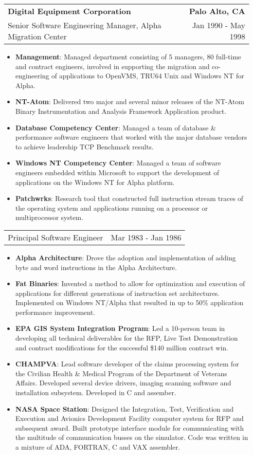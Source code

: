 \documentclass[letterpaper,11pt]{article}
\makeatletter
\newcommand{\resumeCompanyHeading}[4]{
  \vspace{-1pt}
    \item
    \begin{tabular*}{1.0\textwidth}[t]{l@{\extracolsep{\fill}}r}
      \textbf{#1} & \textbf{#2} \\
      {#3} & {#4}
    \end{tabular*}\vspace{-10pt}
  }
\newcommand{\resumeCompanyPositionHeading}[2]{
      \item
      \begin{tabular*}{1.0\textwidth}{l@{\extracolsep{\fill}}r}
        {#1} & {#2}
    \end{tabular*}\vspace{-10pt}
}
\newcommand{\resumeItem}[2]{\item{{\textbf{\small#1}}: {\small#2 \vspace{-1pt}}}}
\newcommand{\resumeItemListStart}{\begin{itemize}}
\newcommand{\resumeItemListEnd}{\end{itemize}}\vspace{-10pt}
\makeatother
\begin{document}
        \resumeCompanyHeading
          {Digital Equipment Corporation}{Palo Alto, CA}
          {Senior Software Engineering Manager, Alpha Migration Center}{Jan 1990 - May 1998}
                 \resumeItemListStart
                 \resumeItem{Management}{Managed department consisting of 5 managers, 80 full-time and contract engineers, involved in supporting the migration and
                                        co-engineering of applications to OpenVMS, TRU64 Unix and Windows NT for Alpha.}
                 \resumeItem{NT-Atom}{Delivered two major and several minor releases of the NT-Atom Binary Instrumentation
                             and Analysis Framework Application product.}
                \resumeItem{Database Competency Center}{Managed a team of database \& performance software engineers that worked with 
                            the major database vendors to achieve leadership TCP Benchmark results.}
                \resumeItem{Windows NT Competency Center}{Managed a team of software engineers embedded within Microsoft to support the development of applications
                            on the Windows NT for Alpha platform.}
                \resumeItem{Patchwrks}{Research tool that constructed full instruction stream traces of the operating system and applications running on a processor 
                            or multiprocessor system.}
            \resumeItemListEnd

        \resumeCompanyPositionHeading
          {Principal Software Engineer}{Mar 1983 - Jan 1986}
          \resumeItemListStart
            \resumeItem{Alpha Architecture}{Drove the adoption and implementation of adding byte and word instructions in the Alpha Architecture.}
            \resumeItem{Fat Binaries}{Invented a method to allow for optimization and execution of applications for different generations 
              of instruction set architectures.  Implemented on Windows NT/Alpha that resulted in up to 50\% application performance improvement.}
            \resumeItem{EPA GIS System Integration Program}{Led a 10-person team in developing all technical deliverables for the RFP, Live Test Demonstration and contract
              modifications for the successful \$140 million contract win.}
            \resumeItem{CHAMPVA}{Lead software developer of the claims processing system for the Civilian Health \& Medical Program of the 
              Department of Veterans Affairs.  Developed several device drivers, imaging scanning software and installation subsystem.  Developed in C and assember.}
            \resumeItem{NASA Space Station}{Designed the Integration, Test, Verification and Execution and Avionics Development Facility computer system for 
              RFP and subsequent award. Built  prototype interface module for communicating with the multitude of communication busses on the simulator. 
              Code was written in a mixture of ADA, FORTRAN, C and VAX assembler.}
          \resumeItemListEnd
    
\end{document}
